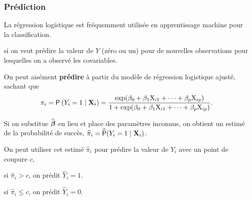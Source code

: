 \documentclass{beamer}
\begin{document}
\begin{frame}[fragile]
\frametitle{Prédiction}
\bi
\item La régression logistique est fréquemment utilisée en apprentissage machine pour la classification.
\bi
 
\item si on veut prédire la valeur de $Y$ (zéro ou un) pour de nouvelles observations pour lesquelles on a observé les covariables.
\ei
\item On peut aisément \textbf{prédire} à partir du modèle de régression logistique ajusté, sachant que
\begin{align*}
\pi_i=\P{Y_i=1\mid \mathbf{X}_i}=\frac{\exp(\beta_0+ \beta_1 \mathrm{X}_{i1}+\cdots + \beta_p \mathrm{X}_{ip})}{1+\exp(\beta_0+ \beta_1 \mathrm{X}_{i1}+\cdots + \beta_p \mathrm{X}_{ip})}.
\end{align*}
\item Si on substitue $\hat{\bs{\beta}}$ en lieu et place des paramètres inconnus, on obtient un estimé de la probabilité de succès,  $\hat{\pi}_i=\widehat{\p}(Y_i=1\mid \mathbf{X}_i)$.
\item On peut utiliser cet estimé $\widehat{\pi}_i$ pour prédire la valeur de $Y_i$ avec un point de coupure $c$, 
\bi
 \item si $\hat{\pi}_i > c$, on prédit $\hat{Y}_i=1$.
\item si $\hat{\pi}_i \leq c$, on prédit $\hat{Y}_i=0$.
\ei
\ei
\end{frame}
\end{document}
